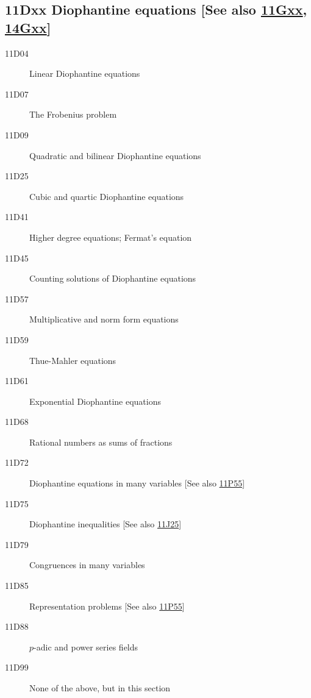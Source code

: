 \documentclass[letterpaper]{article}
\begin{document}
\subsection*{11Dxx  Diophantine equations [See also \hyperref[11Gxx]{11Gxx}, \hyperref[14Gxx]{14Gxx}] }\label{11Dxx}
\begin{description}  
\item [11D04]\label{11D04} Linear Diophantine equations
\item [11D07]\label{11D07} The Frobenius problem
\item [11D09]\label{11D09} Quadratic and bilinear Diophantine equations
\item [11D25]\label{11D25} Cubic and quartic Diophantine equations
\item [11D41]\label{11D41} Higher degree equations; Fermat's equation
\item [11D45]\label{11D45} Counting solutions of Diophantine equations
\item [11D57]\label{11D57} Multiplicative and norm form equations
\item [11D59]\label{11D59} Thue-Mahler equations
\item [11D61]\label{11D61} Exponential Diophantine equations
\item [11D68]\label{11D68} Rational numbers as sums of fractions
\item [11D72]\label{11D72} Diophantine equations in many variables [See also \hyperref[11P55]{11P55}]
\item [11D75]\label{11D75} Diophantine inequalities [See also \hyperref[11J25]{11J25}]
\item [11D79]\label{11D79} Congruences in many variables
\item [11D85]\label{11D85} Representation problems [See also \hyperref[11P55]{11P55}]
\item [11D88]\label{11D88} $p$-adic and power series fields
\item [11D99]\label{11D99} None of the above, but in this section
\end{description}
\end{document}
